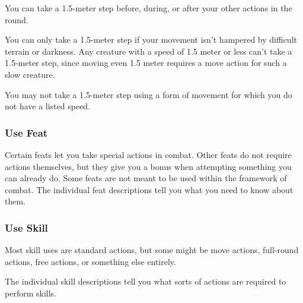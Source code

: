 You can take a 1.5-meter step before, during, or after your other actions in the round.

You can only take a 1.5-meter step if your movement isn't hampered by difficult terrain or darkness. Any creature with a speed of 1.5 meter or less can't take a 1.5-meter step, since moving even 1.5 meter requires a move action for such a slow creature.

You may not take a 1.5-meter step using a form of movement for which you do not have a listed speed.

\subsubsection{Use Feat}
Certain feats let you take special actions in combat. Other feats do not require actions themselves, but they give you a bonus when attempting something you can already do. Some feats are not meant to be used within the framework of combat. The individual feat descriptions tell you what you need to know about them.

\subsubsection{Use Skill}
Most skill uses are standard actions, but some might be move actions, full-round actions, free actions, or something else entirely.

The individual skill descriptions tell you what sorts of actions are required to perform skills.
